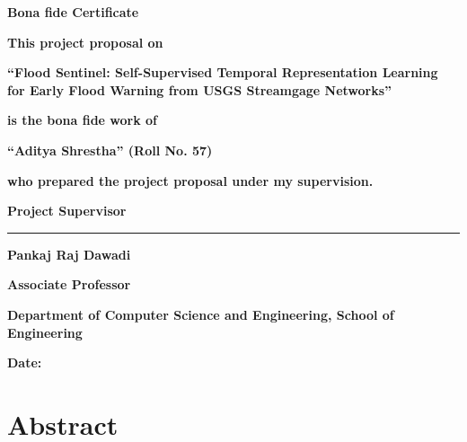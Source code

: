 \documentclass[12pt]{report}
\newcommand{\ProjectTitle}{Flood Sentinel: Self-Supervised Temporal Representation Learning for Early Flood Warning from USGS Streamgage Networks}
\newcommand{\StudentOne}{Aditya Shrestha}
\newcommand{\RollNo}{Roll No. 57}
\newcommand{\SupervisorName}{Pankaj Raj Dawadi}
\newcommand{\SupervisorDesignation}{Associate Professor}
\newcommand{\SupervisorDept}{Department of Computer Science and Engineering, School of Engineering}
\begin{document}
\thispagestyle{empty}
\setlength{\parskip}{0pt}

\begin{center}
  {\fontsize{16pt}{19.2pt}\selectfont\bfseries Bona fide Certificate\par}
\end{center}

\vspace{3cm}

\begin{center}
  {\bfseries This project proposal on\par}
  \vspace{0.3cm}
  {\bfseries ``\ProjectTitle''\par}
  \vspace{0.3cm}
  {\bfseries is the bona fide work of\par}
  \vspace{0.3cm}
  {\bfseries ``\StudentOne'' (\RollNo)\par}
  \vspace{0.3cm}
  {\bfseries who prepared the project proposal under my supervision.\par}
\end{center}

\vspace{4cm}

{\bfseries Project Supervisor\par}
\vspace{1.5cm}
{\bfseries \rule{6cm}{0.4pt}\par}
{\bfseries \SupervisorName\par}
{\bfseries \SupervisorDesignation\par}
{\bfseries \SupervisorDept\par}
\vspace{0.8cm}
{\bfseries Date:\par}

\newpage
{}
\setlength{\parskip}{18pt}


\chapter*{Abstract}
\end{document}
